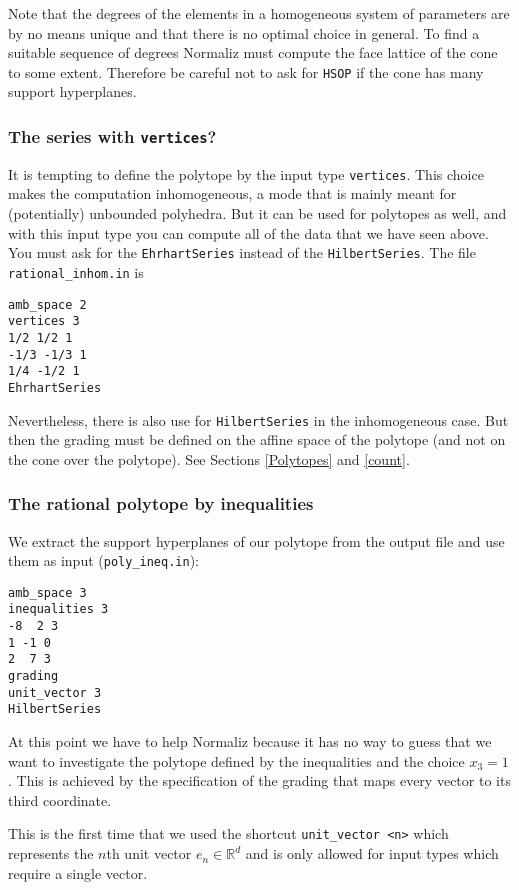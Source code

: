 \documentclass[12pt,a4paper]{scrartcl}
\theoremstyle{definition}
\def\RR{{\mathbb R}}
\def\ttt{\texttt}
\begin{document}
Note that the degrees of the elements in a homogeneous system of parameters are by no means unique and that there is no optimal choice in general. To find a suitable sequence of degrees Normaliz must compute the face lattice of the cone to some extent. Therefore be careful not to ask for \verb|HSOP| if the cone has many support hyperplanes.

\subsubsection{The  series with \ttt{vertices}?}

It is tempting to define the polytope by the input type \verb|vertices|. This choice makes the computation inhomogeneous, a mode that is mainly meant for (potentially) unbounded polyhedra. But it can be used for polytopes as well, and with this input type you can compute all of the data that we have seen above. You must ask for the \verb|EhrhartSeries| instead of the \verb|HilbertSeries|. The file \verb|rational_inhom.in| is
\begin{Verbatim}
amb_space 2
vertices 3
1/2 1/2 1
-1/3 -1/3 1
1/4 -1/2 1
EhrhartSeries
\end{Verbatim}

Nevertheless, there is also use for \verb|HilbertSeries| in the inhomogeneous case. But then the grading must be defined on the affine space of the polytope (and not on the cone over the polytope). See Sections \ref{Polytopes} and \ref{count}.

\subsubsection{The rational polytope by inequalities}\label{rat_ineq}

We extract the support hyperplanes of our polytope from the output file and use them as input (\verb|poly_ineq.in|):
\begin{Verbatim}
amb_space 3
inequalities 3
-8  2 3
1 -1 0
2  7 3
grading
unit_vector 3
HilbertSeries
\end{Verbatim}
At this point we have to help Normaliz because it has no way to guess that we want to investigate the polytope defined by the inequalities and the choice $x_3=1$. This is achieved by the specification of the grading that maps every vector to its third coordinate.

This is the first time that we used the shortcut \verb|unit_vector <n>| which represents the $n$th unit vector $e_n\in\RR^d$ and is only allowed for input types which require a single vector.
\end{document}
